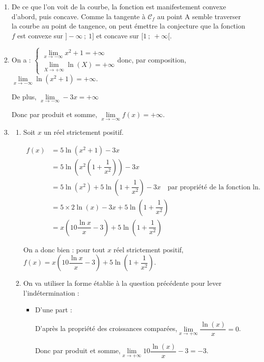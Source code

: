 \begin{enumerate}
\item De ce que l'on voit de la courbe, la fonction est manifestement convexe d'abord, puis concave. Comme la tangente à $\mathcal{C}_f$ au point A semble traverser la courbe au point de tangence, on peut émettre la conjecture que la fonction $f$ est convexe sur $]-\infty~;~1]$ et concave sur $[1~;~+\infty[$.
\item On a :
\quad $ \begin{cases} \lim\limits_{x \to -\infty } x^2+1 = +\infty \\
\lim\limits_{X \to +\infty } \ln(X) = +\infty \end{cases} $\quad donc, par composition, \quad $ \lim\limits_{x \to -\infty} \ln (x^2+1) = +\infty$.

De plus, \quad $\lim\limits_{x \to -\infty} -3x = +\infty$

Donc par produit et somme, \quad $\lim\limits_{x \to -\infty} f(x) = +\infty$.
\item 
	\begin{enumerate}
		\item Soit $x$ un réel strictement positif.

$\begin{aligned} f(x) &= 5 \ln \left(x^{2}+1\right)-3 x\\
	&= 5 \ln \left(x^{2} \left(1 + \dfrac{1}{x^2}\right)\right)-3 x \\
	&= 5\ln \left(x^2 \right) + 5 \ln \left(1+\dfrac{1}{x^{2}}\right) -3x\quad \text{par propriété de la fonction ln}.\\
	&= 5 \times 2 \ln(x) -3x + 5 \ln \left(1+\dfrac{1}{x^{2}}\right) \\
	&= x\left(10 \dfrac{\ln x}{x}-3\right)+5 \ln \left(1+\dfrac{1}{x^{2}}\right)
\end{aligned}$

On a donc bien : pour tout $x$ réel strictement positif,\quad $f(x)=x\left(10 \dfrac{\ln x}{x}-3\right)+5 \ln \left(1+\dfrac{1}{x^{2}}\right)$.
		\item On va utiliser la forme établie à la question précédente pour lever l'indétermination :
		\begin{itemize}
			\item D'une part :

D'après la propriété des croissances comparées,\quad $\lim\limits_{x\to +\infty} \dfrac{\ln(x)}{x} = 0$.

Donc par produit et somme,\quad $ \lim\limits_{x\to +\infty} 10\dfrac{\ln(x)}{x} - 3= - 3$.


\end{itemize}
\end{enumerate}
\end{enumerate}
